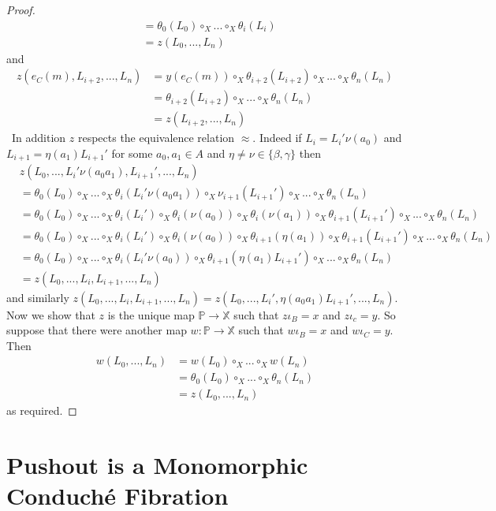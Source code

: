 \documentclass{article}
\begin{document}
\begin{lemma}
\begin{proof}
\begin{align*}
			&=\theta_0(L_0)\circ_X ... \circ_X\theta_i(L_i)\\
			&=z(L_0,...,L_n)
		\end{align*}
		and
		\begin{align*}
			z(e_C(m),L_{i+2},...,L_n) & = y(e_C(m))\circ_X \theta_{i+2}(L_{i+2})\circ_X ... \circ_X\theta_n(L_n)\\
			&=\theta_{i+2}(L_{i+2})\circ_X ... \circ_X \theta_n(L_n)\\
			&=z(L_{i+2},...,L_n)
		\end{align*}\
		In addition $z$ respects the equivalence relation $\approx$.
		Indeed if $L_i=L_i'\nu(a_0)$ and $L_{i+1}=\eta(a_1)L_{i+1}'$ for some $a_0,a_1\in A$ and $\eta\neq \nu\in\{\beta,\gamma\}$ then
		\begin{align*}
			&z(L_0,...,L_i'\nu(a_0 a_1),L_{i+1}',...,L_n)\\
			&=\theta_0(L_0)\circ_X ... \circ_X \theta_i(L_i'\nu(a_0 a_1))\circ_X\nu_{i+1}(L_{i+1}')\circ_X...\circ_X\theta_n(L_n)\\
			&=\theta_0(L_0)\circ_X ... \circ_X \theta_{i}(L_i')\circ_X \theta_i(\nu(a_0)) \circ_X \theta_i(\nu(a_1)) \circ_X\theta_{i+1}(L_{i+1}')\circ_X ... \circ_X\theta_n(L_n)\\
			&=\theta_0(L_0)\circ_X ... \circ_X \theta_{i}(L_i')\circ_X \theta_i(\nu(a_0)) \circ_X \theta_{i+1}(\eta(a_1)) \circ_X\theta_{i+1}(L_{i+1}')\circ_X ... \circ_X\theta_n(L_n)\\
			&=\theta_0(L_0)\circ_X ... \circ_X \theta_{i}(L_i'\nu(a_0)) \circ_X \theta_{i+1}(\eta(a_1)L_{i+1}')\circ_X ... \circ_X\theta_n(L_n)\\
			&=z(L_0,...,L_i,L_{i+1},...,L_n)
		\end{align*}
		and similarly $z(L_0,...,L_i,L_{i+1},...,L_n)=z(L_0,...,L_i',\eta(a_0 a_1)L_{i+1}',...,L_n)$.
		Now we show that $z$ is the unique map $\mathbb{P}\rightarrow \mathbb{X}$ such that $z\iota_B=x$ and $z\iota_c = y$.
		So suppose that there were another map $w:\mathbb{P}\rightarrow \mathbb{X}$ such that $w\iota_B = x$ and $w\iota_C = y$.
		Then
		\begin{align*}
			w(L_0,...,L_n) &= w(L_0)\circ_X ...\circ_X w(L_n)\\
			&=\theta_0(L_0) \circ_X...\circ_X\theta_n(L_n)\\
			&=z(L_0,...,L_n)
		\end{align*}
		as required.
	\end{proof}
\end{lemma}

\section{Pushout is a Monomorphic Conduch\'{e} Fibration}
\end{document}
